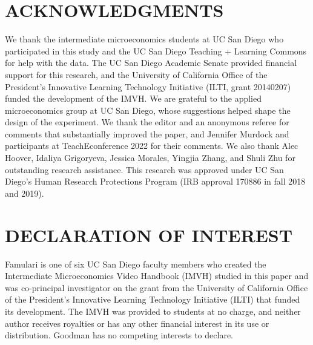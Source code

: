 \theendnotes

\section*{ACKNOWLEDGMENTS}
We thank the intermediate microeconomics students at UC San Diego who participated in this study and the UC San Diego Teaching + Learning Commons for help with the data.
The UC San Diego Academic Senate provided financial support for this research, and the University of California Office of the President's Innovative Learning Technology Initiative (ILTI, grant 20140207) funded the development of the IMVH.
We are grateful to the applied microeconomics group at UC San Diego, whose suggestions helped shape the design of the experiment.
We thank the editor and an anonymous referee for comments that substantially improved the paper, and Jennifer Murdock and participants at TeachEconference 2022 for their comments.
We also thank Alec Hoover, Idaliya Grigoryeva, Jessica Morales, Yingjia Zhang, and Shuli Zhu for outstanding research assistance.
This research was approved under UC San Diego's Human Research Protections Program (IRB approval 170886 in fall 2018 and 2019).

\section*{DECLARATION OF INTEREST}
Famulari is one of six UC San Diego faculty members who created the Intermediate Microeconomics Video Handbook (IMVH) studied in this paper and was co-principal investigator on the grant from the University of California Office of the President's Innovative Learning Technology Initiative (ILTI) that funded its development.
The IMVH was provided to students at no charge, and neither author receives royalties or has any other financial interest in its use or distribution.
Goodman has no competing interests to declare.

